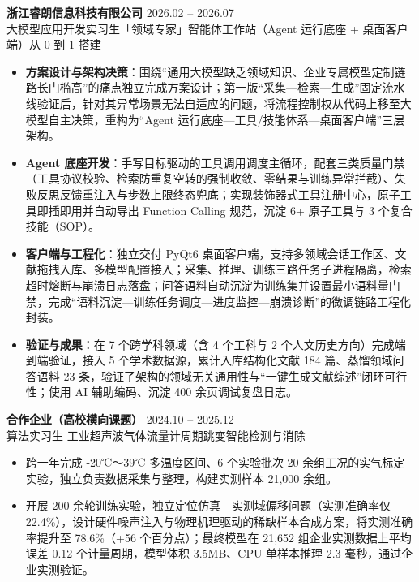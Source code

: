 \documentclass[11pt]{article}
\newlength{\interProjectSpacing}
\newcommand{\projectsep}{\vspace{\interProjectSpacing}}
\newlength{\intraProjectListTopSep}
\begin{document}
\textbf{浙江睿朗信息科技有限公司} \hfill 2026.02 -- 2026.07\\[0.5em]
大模型应用开发实习生\quad 「领域专家」智能体工作站（Agent 运行底座 + 桌面客户端）从 0 到 1 搭建
\begin{itemize}[nosep, topsep=\intraProjectListTopSep]
    \item \textbf{方案设计与架构决策}：围绕“通用大模型缺乏领域知识、企业专属模型定制链路长门槛高”的痛点独立完成方案设计；第一版“采集—检索—生成”固定流水线验证后，针对其异常场景无法自适应的问题，将流程控制权从代码上移至大模型自主决策，重构为“Agent 运行底座—工具/技能体系—桌面客户端”三层架构。
    \item \textbf{Agent 底座开发}：手写目标驱动的工具调用调度主循环，配套三类质量门禁（工具协议校验、检索防重复空转的强制收敛、零结果与训练异常拦截）、失败反思反馈重注入与步数上限终态兜底；实现装饰器式工具注册中心，原子工具即插即用并自动导出 Function Calling 规范，沉淀 6+ 原子工具与 3 个复合技能（SOP）。
    \item \textbf{客户端与工程化}：独立交付 PyQt6 桌面客户端，支持多领域会话工作区、文献拖拽入库、多模型配置接入；采集、推理、训练三路任务子进程隔离，检索超时熔断与崩溃日志落盘；问答语料自动沉淀为训练集并设置最小语料量门禁，完成“语料沉淀—训练任务调度—进度监控—崩溃诊断”的微调链路工程化封装。
    \item \textbf{验证与成果}：在 7 个跨学科领域（含 4 个工科与 2 个人文历史方向）完成端到端验证，接入 5 个学术数据源，累计入库结构化文献 184 篇、蒸馏领域问答语料 23 条，验证了架构的领域无关通用性与“一键生成文献综述”闭环可行性；使用 AI 辅助编码、沉淀 400 余页调试复盘日志。
\end{itemize}

\projectsep

\textbf{合作企业（高校横向课题）} \hfill 2024.10 -- 2025.12\\[0.5em]
算法实习生 \quad 工业超声波气体流量计周期跳变智能检测与消除
\begin{itemize}[nosep, topsep=\intraProjectListTopSep]
    \item 跨一年完成 -20℃～39℃ 多温度区间、6 个实验批次 20 余组工况的实气标定实验，独立负责数据采集与整理，构建实测样本 21,000 余组。
    \item 开展 200 余轮训练实验，独立定位仿真—实测域偏移问题（实测准确率仅 22.4\%），设计硬件噪声注入与物理机理驱动的稀缺样本合成方案，将实测准确率提升至 78.6\%（+56 个百分点）；最终模型在 21,652 组企业实测数据上平均误差 0.12 个计量周期，模型体积 3.5MB、CPU 单样本推理 2.3 毫秒，通过企业实测验证。
\end{itemize}
\end{document}
